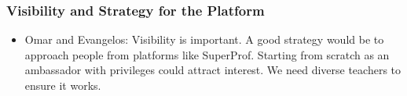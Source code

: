 \begin{enumerate}
\subsubsection*{Visibility and Strategy for the Platform}
\begin{itemize}
\item Omar and Evangelos: Visibility is important.
A good strategy would be to approach people from platforms like SuperProf.
Starting from scratch as an ambassador with privileges could attract interest.
We need diverse teachers to ensure it works.
\end{itemize}
\end{enumerate}